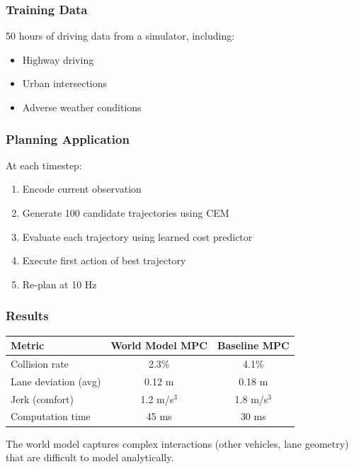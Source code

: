 \subsubsection{Training Data}

50 hours of driving data from a simulator, including:
\begin{itemize}
    \item Highway driving
    \item Urban intersections
    \item Adverse weather conditions
\end{itemize}

\subsubsection{Planning Application}

At each timestep:
\begin{enumerate}
    \item Encode current observation
    \item Generate 100 candidate trajectories using CEM
    \item Evaluate each trajectory using learned cost predictor
    \item Execute first action of best trajectory
    \item Re-plan at 10 Hz
\end{enumerate}

\subsubsection{Results}

\begin{center}
\begin{tabular}{lcc}
\toprule
\textbf{Metric} & \textbf{World Model MPC} & \textbf{Baseline MPC} \\
\midrule
Collision rate & 2.3\% & 4.1\% \\
Lane deviation (avg) & 0.12 m & 0.18 m \\
Jerk (comfort) & 1.2 m/s$^3$ & 1.8 m/s$^3$ \\
Computation time & 45 ms & 30 ms \\
\bottomrule
\end{tabular}
\end{center}

The world model captures complex interactions (other vehicles, lane geometry) that are difficult to model analytically.

